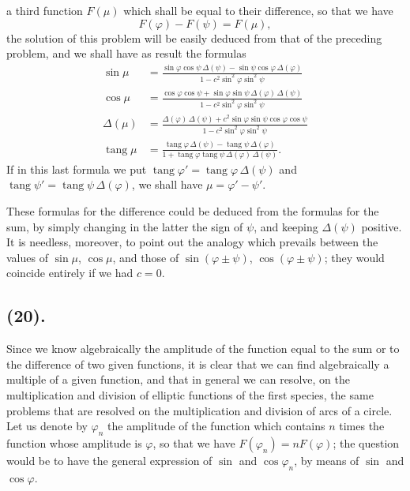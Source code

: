\documentclass{article}
\begin{document}
a third function $F(\mu)$ which shall be equal to their difference, so that we have
\[ F(\varphi)-F(\psi)=F(\mu), \]
the solution of this problem will be easily deduced from that of the preceding problem, and we shall have as result the formulas
\[ \begin{aligned} \sin\mu &= \frac{\sin\varphi\cos\psi\,\Delta(\psi)-\sin\psi\cos\varphi\,\Delta(\varphi)}{1-c^{2}\sin^{2}\varphi\sin^{2}\psi} \\ \cos\mu &= \frac{\cos\varphi\cos\psi+\sin\varphi\sin\psi\,\Delta(\varphi)\,\Delta(\psi)}{1-c^{2}\sin^{2}\varphi\sin^{2}\psi} \\ \Delta(\mu) &= \frac{\Delta(\varphi)\,\Delta(\psi)+c^{2}\sin\varphi\sin\psi\cos\varphi\cos\psi}{1-c^{2}\sin^{2}\varphi\sin^{2}\psi} \\ \operatorname{tang}\mu &= \frac{\operatorname{tang}\varphi\,\Delta(\psi)-\operatorname{tang}\psi\,\Delta(\varphi)}{1+\operatorname{tang}\varphi\operatorname{tang}\psi\,\Delta(\varphi)\,\Delta(\psi)}. \end{aligned} \]
If in this last formula we put $\operatorname{tang}\varphi'=\operatorname{tang}\varphi\,\Delta(\psi)$ and $\operatorname{tang}\psi'=\operatorname{tang}\psi\,\Delta(\varphi)$, we shall have $\mu=\varphi'-\psi'$.

These formulas for the difference could be deduced from the formulas for the sum, by simply changing in the latter the sign of $\psi$, and keeping $\Delta(\psi)$ positive. It is needless, moreover, to point out the analogy which prevails between the values of $\sin\mu$, $\cos\mu$, and those of $\sin(\varphi\pm\psi)$, $\cos(\varphi\pm\psi)$; they would coincide entirely if we had $c=0$.

\subsection*{(20).}

Since we know algebraically the amplitude of the function equal to the sum or to the difference of two given functions, it is clear that we can find algebraically a multiple of a given function, and that in general we can resolve, on the multiplication and division of elliptic functions of the first species, the same problems that are resolved on the multiplication and division of arcs of a circle. Let us denote by $\varphi_{n}$ the amplitude of the function which contains $n$ times the function whose amplitude is $\varphi$, so that we have $F(\varphi_{n})=nF(\varphi)$; the question would be to have the general expression of $\sin$ and $\cos\varphi_{n}$, by means of $\sin$ and $\cos\varphi$.
\end{document}
